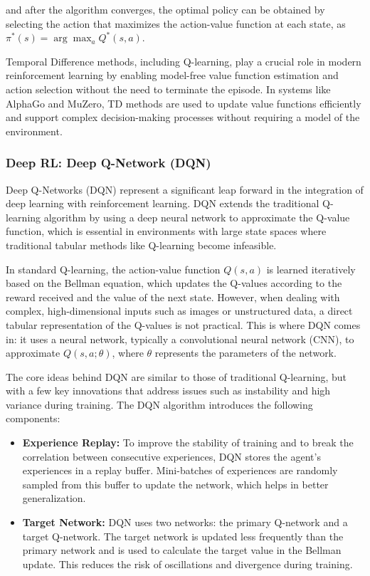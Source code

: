 and after the algorithm converges, the optimal policy can be obtained by
selecting the action that maximizes the action-value function at each state, as
$\pi^*(s) = \arg\max_a Q^*(s, a)$.

Temporal Difference methods, including Q-learning, play a crucial role in
modern reinforcement learning by enabling model-free value function estimation
and action selection without the need to terminate the episode. In systems like
AlphaGo and MuZero, TD methods are used to update value functions efficiently
and support complex decision-making processes without requiring a model of the
environment.

\subsubsection{\textbf{Deep RL: Deep Q-Network (DQN)}}

Deep Q-Networks (DQN) represent a significant leap forward in the integration
of deep learning with reinforcement learning. DQN extends the traditional
Q-learning algorithm by using a deep neural network to approximate the Q-value
function, which is essential in environments with large state spaces where
traditional tabular methods like Q-learning become infeasible.

In standard Q-learning, the action-value function \(Q(s, a)\) is learned
iteratively based on the Bellman equation, which updates the Q-values according
to the reward received and the value of the next state. However, when dealing
with complex, high-dimensional inputs such as images or unstructured data, a
direct tabular representation of the Q-values is not practical. This is where
DQN comes in: it uses a neural network, typically a convolutional neural
network (CNN), to approximate \(Q(s, a; \theta)\), where \(\theta\) represents
the parameters of the network.

The core ideas behind DQN are similar to those of traditional Q-learning, but
with a few key innovations that address issues such as instability and high
variance during training. The DQN algorithm introduces the following
components:

\begin{itemize}
    \item \textbf{Experience Replay:} To improve the stability of training and to break the correlation between consecutive experiences, DQN stores the agent’s experiences in a replay buffer. Mini-batches of experiences are randomly sampled from this buffer to update the network, which helps in better generalization.
    \item \textbf{Target Network:} DQN uses two networks: the primary Q-network and a target Q-network. The target network is updated less frequently than the primary network and is used to calculate the target value in the Bellman update. This reduces the risk of oscillations and divergence during training.
\end{itemize}

